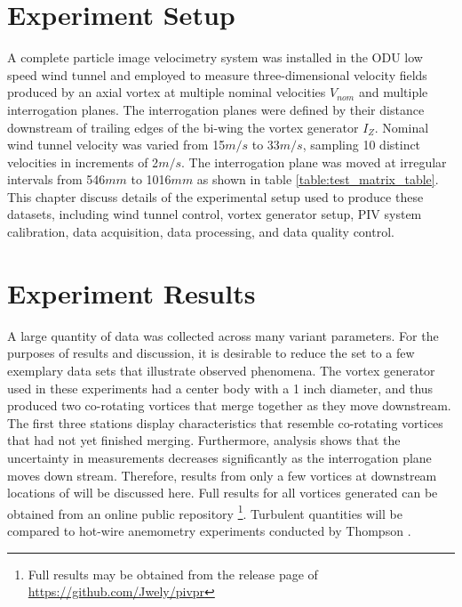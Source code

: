 \documentclass[12pt]{report}
\begin{document}



\chapter{Experiment Setup}
A complete particle image velocimetry system was installed in the ODU low speed 
wind tunnel and employed to measure three-dimensional velocity fields produced 
by an axial vortex at multiple nominal velocities $V_{nom}$ and multiple 
interrogation planes. The interrogation planes were defined by their 
distance downstream of trailing edges of the bi-wing the vortex generator 
$I_Z$. Nominal wind tunnel velocity was varied from 15$m/s$ to 33$m/s$, 
sampling 10 distinct velocities in increments of 2$m/s$. The interrogation 
plane was moved at irregular intervals from 546$mm$ to 1016$mm$ as shown in 
table \ref{table:test_matrix_table}. This chapter discuss details of the 
experimental setup used to produce these datasets, including wind tunnel 
control, vortex generator setup, PIV system calibration, data acquisition, data 
processing, and data quality control.









\chapter{Experiment Results}

A large quantity of data was collected across many variant parameters. For the 
purposes of results and discussion, it is desirable to reduce the set to a few 
exemplary data sets that illustrate observed phenomena. The vortex generator 
used in these experiments had a center body with a 1 inch diameter, and thus 
produced two co-rotating vortices that merge together as they move downstream. 
The first three stations display characteristics that resemble co-rotating 
vortices that had not yet finished merging. Furthermore, analysis shows that 
the uncertainty in measurements decreases significantly as the interrogation 
plane moves down stream. Therefore, results from only a few vortices at 
downstream locations of  will be 
discussed here. Full results for all vortices generated can be 
obtained from an online public repository 
\footnote{Full results may be obtained from the release page of
\url{https://github.com/Jwely/pivpr}}. Turbulent quantities will be 
compared to hot-wire anemometry experiments conducted by Thompson 
\cite{thompson2016}.
\end{document}
